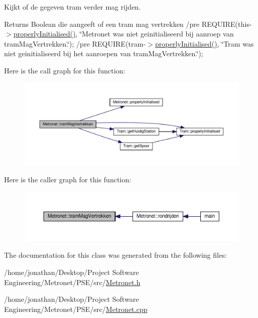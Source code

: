 Kijkt of de gegeven tram verder mag rijden. 

\begin{DoxyReturn}{Returns}
Boolean die aangeeft of een tram mag vertrekken /pre R\+E\+Q\+U\+I\+RE(this-\/$>$\hyperlink{class_metronet_a3d2adce29a947f162924279b766de645}{properly\+Initialised()}, \char`\"{}\+Metronet was niet geinitialiseerd bij aanroep van tram\+Mag\+Vertrekken.\char`\"{}); /pre R\+E\+Q\+U\+I\+RE(tram-\/$>$\hyperlink{class_metronet_a3d2adce29a947f162924279b766de645}{properly\+Initialised()}, \char`\"{}\+Tram was niet geinitialiseerd bij het aanroepen van tram\+Mag\+Vertrekken.\char`\"{}); 
\end{DoxyReturn}


Here is the call graph for this function\+:
\nopagebreak
\begin{figure}[H]
\begin{center}
\leavevmode
\includegraphics[width=350pt]{class_metronet_adad7cd43bc0e48a00fbd87a1288fd498_cgraph}
\end{center}
\end{figure}




Here is the caller graph for this function\+:
\nopagebreak
\begin{figure}[H]
\begin{center}
\leavevmode
\includegraphics[width=350pt]{class_metronet_adad7cd43bc0e48a00fbd87a1288fd498_icgraph}
\end{center}
\end{figure}




The documentation for this class was generated from the following files\+:\begin{DoxyCompactItemize}
\item 
/home/jonathan/\+Desktop/\+Project Software Engineering/\+Metronet/\+P\+S\+E/src/\hyperlink{_metronet_8h}{Metronet.\+h}\item 
/home/jonathan/\+Desktop/\+Project Software Engineering/\+Metronet/\+P\+S\+E/src/\hyperlink{_metronet_8cpp}{Metronet.\+cpp}\end{DoxyCompactItemize}
